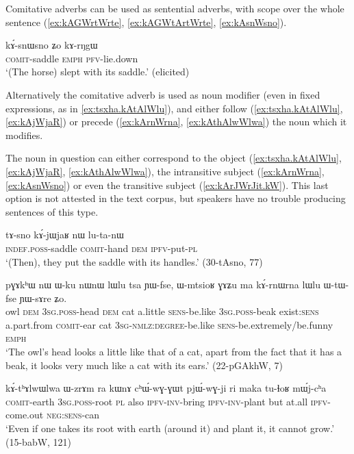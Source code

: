 Comitative adverbs can be used as sentential adverbs, with scope over the whole sentence (\ref{ex:kAGWrtWrte}, \ref{ex:kAGWtArtWrte}, \ref{ex:kAsnWsno}). 

\begin{exe}
\ex \label{ex:kAsnWsno}
\gll kɤ́-snɯ\tld{}sno 	ʑo 	kɤ-rŋgɯ \\
\textsc{comit}-saddle \textsc{emph} \textsc{pfv}-lie.down \\
\glt `(The horse) slept with its saddle.' (elicited)
\end{exe}

Alternatively the comitative adverb is used as noun modifier (even in fixed expressions, as in \ref{ex:tsxha.kAtAlWlu}), and either follow (\ref{ex:tsxha.kAtAlWlu}, \ref{ex:kAjWjaR}) or precede (\ref{ex:kArnWrna}, \ref{ex:kAthAlwWlwa}) the noun which it modifies.

The noun in question can either correspond to the object (\ref{ex:tsxha.kAtAlWlu}, \ref{ex:kAjWjaR}, \ref{ex:kAthAlwWlwa}), the intransitive subject (\ref{ex:kArnWrna}, \ref{ex:kAsnWsno}) or even the transitive subject (\ref{ex:kArJWrJit.kW}). This last option is not attested in the text corpus, but speakers have no trouble producing sentences of this type.


\begin{exe}
\ex \label{ex:kAjWjaR}
\gll tɤ-sno 	kɤ́-jɯ\redp{}jaʁ 	nɯ 	lu-ta-nɯ \\
\textsc{indef.poss}-saddle \textsc{comit}-hand \textsc{dem} \textsc{ipfv}-put-\textsc{pl} \\
\glt `(Then), they put the saddle with its handles.' (30-tAsno, 77)
\end{exe}
 

\begin{exe}
\ex \label{ex:kArnWrna}
\gll pɣɤkʰɯ 	nɯ 	ɯ-ku 	nɯnɯ 	lɯlu 	tsa 	ɲɯ-fse, 	ɯ-mtsioʁ 	ɣɤʑu 	ma kɤ́-rnɯ\redp{}rna 	lɯlu 	ɯ-tɯ-fse 	ɲɯ-sɤre 	ʑo. \\
owl \textsc{dem} \textsc{3sg.poss}-head \textsc{dem} cat a.little \textsc{sens}-be.like \textsc{3sg.poss}-beak exist:\textsc{sens} a.part.from \textsc{comit}-ear cat \textsc{3sg-nmlz:degree}-be.like \textsc{sens}-be.extremely/be.funny \textsc{emph} \\
\glt `The owl's head looks a little like that of a cat, apart from the fact that it has a beak, it looks very much like a cat with its ears.' (22-pGAkhW, 7)
\end{exe}


\begin{exe}
\ex \label{ex:kAthAlwWlwa}
\gll kɤ́-tʰɤlwɯ\tld{}lwa 	ɯ-zrɤm 	ra 	kɯnɤ 	cʰɯ́-wɣ-ɣɯt 	pjɯ́-wɣ-ji 	ri 	maka 	tu-ɬoʁ 	mɯ́j-cʰa \\  
\textsc{comit}-earth \textsc{3sg.poss}-root \textsc{pl} also \textsc{ipfv-inv}-bring \textsc{ipfv-inv}-plant but at.all \textsc{ipfv}-come.out \textsc{neg:sens}-can \\
\glt `Even if one takes its root with earth (around it) and plant it, it cannot grow.' (15-babW, 121)
\end{exe}


